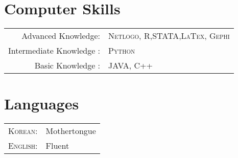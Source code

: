\documentclass[a4paper,10pt]{article}
\begin{document}


 


\section{Computer Skills}
\begin{tabular}{rl}
Advanced Knowledge: & \textsc{Netlogo}, \textsc{R},\textsc{STATA},\textsc{LaTex}, \textsc{Gephi}\\ 
 
Intermediate Knowledge :  & \textsc{Python} \\
Basic Knowledge : & \textsc{JAVA}, \textsc{C++} \\

\end{tabular}



\section{Languages}
\begin{tabular}{rl}
 \textsc{Korean:}&Mothertongue\\
\textsc{English:}&Fluent\\

\end{tabular}

\end{document}
